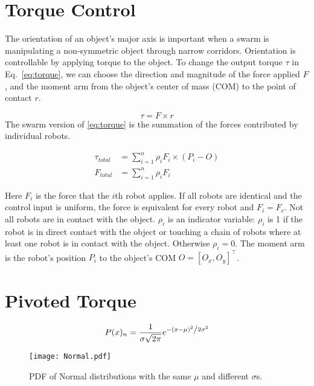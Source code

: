 \section{Torque Control}
\label{sec:theory}


The orientation of an object's major axis is important when a swarm is manipulating a non-symmetric object through narrow corridors. 
Orientation is controllable by applying torque to the object. 
To change the output torque $\tau$ in Eq.~\eqref{eq:torque}, we can choose the direction and magnitude of the force applied $F$, and the moment arm from the object's center of mass (COM) to the point of contact $r$.

\begin{equation}
\tau = F \times r\label{eq:torque}
\end{equation}
The swarm version of \eqref{eq:torque} is the summation of the forces contributed by individual robots.

\begin{align}
\tau_{total} &= \sum\limits_{i=1}^n \rho_i F_i \times (P_i - O )   \label{eq:swarmtorque}\\
F_{total} &= \sum\limits_{i=1}^n \rho_i F_i  \label{eq:swarmforce}
\end{align}

Here $F_i$ is the force that the $i$th robot applies.  If all robots are identical and the control input is uniform, the force is equivalent for every robot and $F_i = F_c$.
Not all robots are in contact with the object.  $\rho_i$ is an indicator variable: $\rho_i$ is 1 if the robot is in direct contact with the object or touching a chain of robots where at least one robot is in contact with the object. Otherwise $\rho_i = 0$.
The moment arm is the robot's position $P_i$ to the object's COM $O=[O_x,O_y]^{\top}$.

\section{Pivoted Torque}
\begin{equation}
P(x)_{n} = \frac{1}{{\sigma \sqrt {2\pi } }}e^{{{ - \left( {x - \mu } \right)^2 } \mathord{\left/ {\vphantom {{ - \left( {x - \mu } \right)^2 } {2\sigma ^2 }}} \right. \kern-\nulldelimiterspace} {2\sigma ^2 }}}
\end{equation}
\begin{figure}
\begin{center}
	\texttt{[image: Normal.pdf]}
\end{center}
\vspace{-1em}
\caption{\label{fig:pdfNorm}
PDF of Normal distributions with the same $\mu$ and different $\sigma$s.
}
\vspace{-1em}
\end{figure}


